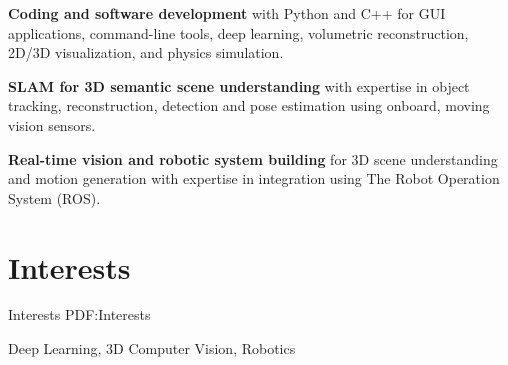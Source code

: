 \documentclass[letterpaper,MMMyyyy,nonstop]{simpleresumecv}
\begin{document}
\begin{body}
\BulletItem
\textbf{Coding and software development} with Python and C++ for GUI applications, command-line tools, deep learning, volumetric reconstruction, 2D/3D visualization, and physics simulation.

\GapNoBreak

\BulletItem
\textbf{SLAM for 3D semantic scene understanding} with expertise in object tracking, reconstruction, detection and pose estimation using onboard, moving vision sensors.

\GapNoBreak

\BulletItem
\textbf{Real-time vision and robotic system building} for 3D scene understanding and motion generation with expertise in integration using The Robot Operation System (ROS).

%
%

\BigGapNoBreak

\section
{Interests}
{Interests}
{PDF:Interests}

Deep Learning,
3D Computer Vision,
Robotics







\end{body}
\end{document}
